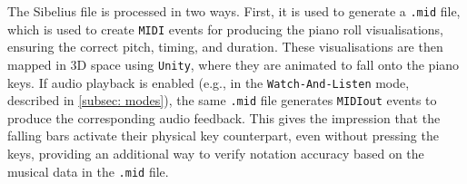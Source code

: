 \documentclass{vgtc}                          %
\begin{document}
\par %
The Sibelius file is processed in two ways. First, it is used to generate a \texttt{.mid} file, which is used to create \texttt{MIDI} events for producing the piano roll visualisations, ensuring the correct pitch, timing, and duration. These visualisations are then mapped in 3D space using \texttt{Unity}, where they are animated to fall onto the piano keys. If audio playback is enabled (e.g., in the \texttt{Watch-And-Listen} mode, described in \autoref{subsec: modes}), the same \texttt{.mid} file generates \texttt{MIDIout} events to produce the corresponding audio feedback. This gives the impression that the falling bars activate their physical key counterpart, even without pressing the keys, providing an additional way to verify notation accuracy based on the musical data in the \texttt{.mid} file.
\end{document}
